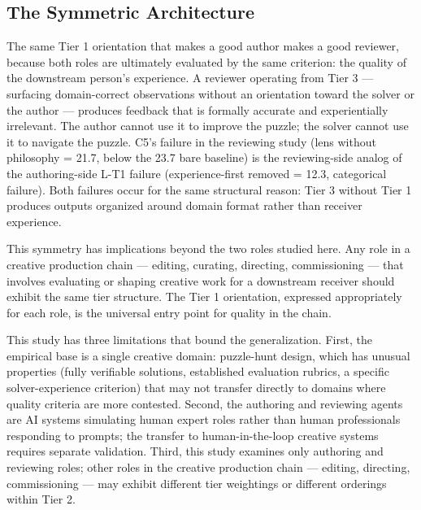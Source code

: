 \subsection{The Symmetric Architecture}

The same Tier 1 orientation that makes a good author makes a good reviewer, because both
roles are ultimately evaluated by the same criterion: the quality of the downstream
person's experience. A reviewer operating from Tier 3 --- surfacing domain-correct
observations without an orientation toward the solver or the author --- produces feedback
that is formally accurate and experientially irrelevant. The author cannot use it to
improve the puzzle; the solver cannot use it to navigate the puzzle. C5's failure in the
reviewing study (lens without philosophy = 21.7, below the 23.7 bare baseline) is the
reviewing-side analog of the authoring-side L-T1 failure (experience-first removed =
12.3, categorical failure). Both failures occur for the same structural reason: Tier 3
without Tier 1 produces outputs organized around domain format rather than receiver
experience.

This symmetry has implications beyond the two roles studied here. Any role in a creative
production chain --- editing, curating, directing, commissioning --- that involves
evaluating or shaping creative work for a downstream receiver should exhibit the same
tier structure. The Tier 1 orientation, expressed appropriately for each role, is the
universal entry point for quality in the chain.

This study has three limitations that bound the generalization. First, the empirical base
is a single creative domain: puzzle-hunt design, which has unusual properties (fully
verifiable solutions, established evaluation rubrics, a specific solver-experience
criterion) that may not transfer directly to domains where quality criteria are more
contested. Second, the authoring and reviewing agents are AI systems simulating human
expert roles rather than human professionals responding to prompts; the transfer to
human-in-the-loop creative systems requires separate validation. Third, this study
examines only authoring and reviewing roles; other roles in the creative production chain
--- editing, directing, commissioning --- may exhibit different tier weightings or
different orderings within Tier 2.
